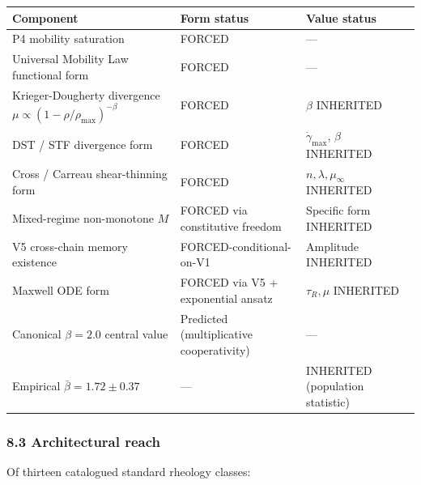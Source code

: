 \documentclass[
  11pt,a4paper]{article}
\newcounter{none} %
\begin{document}
{\def\LTcaptype{none} %
\begin{longtable}[]{@{}
  >{\raggedright\arraybackslash}p{}
  >{\raggedright\arraybackslash}p{}
  >{\raggedright\arraybackslash}p{}@{}}
\toprule\noalign{}
\begin{minipage}[b]{\linewidth}\raggedright
Component
\end{minipage} & \begin{minipage}[b]{\linewidth}\raggedright
Form status
\end{minipage} & \begin{minipage}[b]{\linewidth}\raggedright
Value status
\end{minipage} \\
\midrule\noalign{}
\endhead
\bottomrule\noalign{}
\endlastfoot
P4 mobility saturation & FORCED & --- \\
Universal Mobility Law functional form & FORCED & --- \\
Krieger-Dougherty divergence
\(\mu \propto (1-\rho/\rho_\mathrm{max})^{-\beta}\) & FORCED & \(\beta\)
INHERITED \\
DST / STF divergence form & FORCED & \(\dot\gamma_\mathrm{max}\),
\(\beta\) INHERITED \\
Cross / Carreau shear-thinning form & FORCED &
\(n, \lambda, \mu_\infty\) INHERITED \\
Mixed-regime non-monotone \(M\) & FORCED via constitutive freedom &
Specific form INHERITED \\
V5 cross-chain memory existence & FORCED-conditional-on-V1 & Amplitude
INHERITED \\
Maxwell ODE form & FORCED via V5 + exponential ansatz & \(\tau_R, \mu\)
INHERITED \\
Canonical \(\beta = 2.0\) central value & Predicted (multiplicative
cooperativity) & --- \\
Empirical \(\bar\beta = 1.72 \pm 0.37\) & --- & INHERITED (population
statistic) \\
\end{longtable}
}

\subsubsection{8.3 Architectural reach}\label{architectural-reach}

Of thirteen catalogued standard rheology classes:
\end{document}
